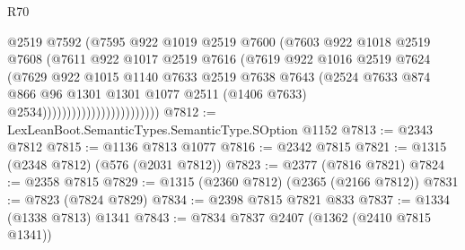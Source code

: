 \begin{lexlean}{R70}
\begin{coremodule}
                                        @2519
                                        @7592
                                        (@7595
                                          @922
                                          @1019
                                          @2519
                                          @7600
                                          (@7603
                                            @922
                                            @1018
                                            @2519
                                            @7608
                                            (@7611
                                              @922
                                              @1017
                                              @2519
                                              @7616
                                              (@7619
                                                @922
                                                @1016
                                                @2519
                                                @7624
                                                (@7629
                                                  @922
                                                  @1015
                                                  @1140
                                                  @7633
                                                  @2519
                                                  @7638
                                                  @7643
                                                  (@2524
                                                    @7633
                                                    @874
                                                    @866
                                                    @96
                                                    @1301
                                                    @1301
                                                    @1077
                                                    @2511
                                                    (@1406 @7633)
                                                    @2534))))))))))))))))))))))))
@7812 := LexLeanBoot.SemanticTypes.SemanticType.SOption @1152
@7813 := @2343 @7812
@7815 := @1136 @7813 @1077
@7816 := @2342 @7815
@7821 := @1315 (@2348 @7812) (@576 (@2031 @7812))
@7823 := @2377 (@7816 @7821)
@7824 := @2358 @7815
@7829 := @1315 (@2360 @7812) (@2365 (@2166 @7812))
@7831 := @7823 (@7824 @7829)
@7834 := @2398 @7815 @7821 @833
@7837 := @1334 (@1338 @7813) @1341
@7843 := @7834 @7837 @2407 (@1362 (@2410 @7815 @1341))

\end{coremodule}
\end{lexlean}
